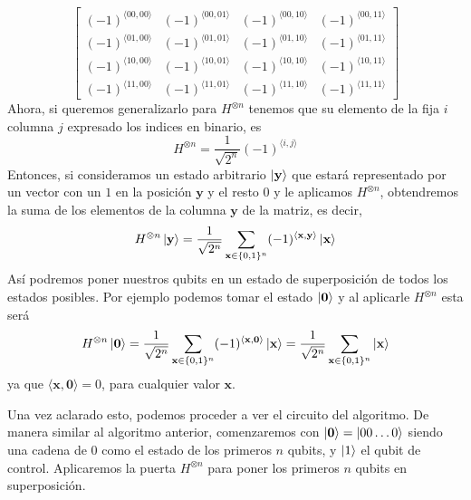 \documentclass[a4paper]{article}
\numberwithin{equation}{section}
\begin{document}
\begin{equation}
\begin{bmatrix}
(-1)^{\langle 00, 00 \rangle} & (-1)^{\langle 00, 01 \rangle} & (-1)^{\langle 00, 10 \rangle} & (-1)^{\langle 00, 11 \rangle} 
\\
(-1)^{\langle 01, 00 \rangle} & (-1)^{\langle 01, 01 \rangle} & (-1)^{\langle 01, 10 \rangle} & (-1)^{\langle 01, 11 \rangle} 
\\
(-1)^{\langle 10, 00 \rangle} & (-1)^{\langle 10, 01 \rangle} & (-1)^{\langle 10, 10 \rangle} & (-1)^{\langle 10, 11 \rangle} 
\\
(-1)^{\langle 11, 00 \rangle} & (-1)^{\langle 11, 01 \rangle} & (-1)^{\langle 11, 10 \rangle} & (-1)^{\langle 11, 11 \rangle}
\end{bmatrix}
\end{equation}
Ahora, si queremos generalizarlo para $H^{\otimes n}$ tenemos que su elemento de la fija $i$ columna $j$ expresado los indices en binario, es
\begin{equation}
H^{\otimes n} = \frac{1}{\sqrt{2^n}}(-1)^{\langle i, j \rangle}
\end{equation}
Entonces, si consideramos un estado arbitrario $\ket{\mathbf{y}}$ que estará representado por un vector con un $1$ en la posición $\mathbf{y}$ y el resto $0$ y le aplicamos $H^{\otimes n}$, obtendremos la suma de los elementos de la columna $\mathbf{y}$ de la matriz, es decir,
\begin{equation} \label{gHadamard}
H^{\otimes n}\ket{\mathbf{y}} =
\frac{1}{\sqrt{2^n}}\sum_{\mathbf{x}\in \{ 0, 1\}^n} (-1)^{\langle \mathbf{x}, \mathbf{y} \rangle} \ket{\mathbf{x}}
\end{equation}
Así podremos poner nuestros qubits en un estado de superposición de todos los estados posibles. Por ejemplo podemos tomar el estado $\ket{\mathbf{0}}$ y al aplicarle $H^{\otimes n}$ esta será
\begin{equation} \label{eq427}
H^{\otimes n}\ket{\mathbf{0}} = 
\frac{1}{\sqrt{2^n}}\sum_{\mathbf{x}\in \{ 0, 1\}^n} (-1)^{\langle \mathbf{x}, \mathbf{0} \rangle} \ket{\mathbf{x}} =
\frac{1}{\sqrt{2^n}}\sum_{\mathbf{x}\in \{ 0, 1\}^n} \ket{\mathbf{x}}
\end{equation}
ya que $\langle \mathbf{x}, \mathbf{0} \rangle = 0$, para cualquier valor $\mathbf{x}$.

\newpage

Una vez aclarado esto, podemos proceder a ver el circuito del algoritmo. De manera similar al algoritmo anterior, comenzaremos con $\ket{\mathbf{0}} = \ket{00\ldots 0}$ siendo una cadena de $0$ como el estado de los primeros $n$ qubits, y $\ket{1}$ el qubit de control. Aplicaremos la puerta $H^{\otimes n}$ para poner los primeros $n$ qubits en superposición.
\end{document}
